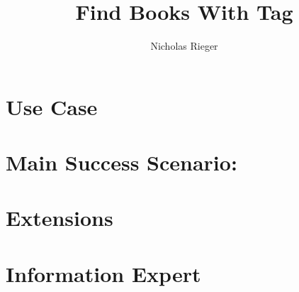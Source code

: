 \documentclass{article}
\title{Find Books With Tag}
\author{Nicholas Rieger}
\begin{document}
\maketitle

\section*{Use Case}

\section*{Main Success Scenario:}

\section*{Extensions}

\section*{Information Expert}
\end{document}
